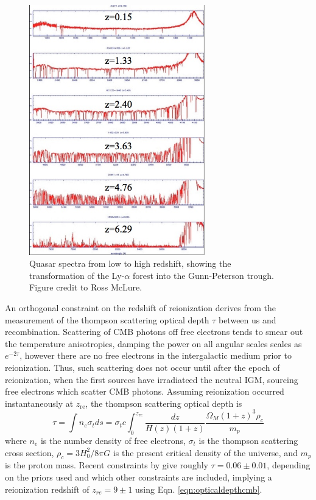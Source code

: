 \begin{figure}
	\centering
	\includegraphics[width=3in]{chap0_intro/lymanalpha_diffz.jpg}
	\caption[Quasar spectra from low to high redshift, showing the transformation of the Ly-$\alpha$ forest into the Gunn-Peterson trough.]{Quasar spectra from low to high redshift, showing the transformation of the Ly-$\alpha$ forest into the Gunn-Peterson trough. Figure credit to Ross McLure.}
	\label{fig:lya}
\end{figure}

An orthogonal constraint on the redshift of reionization derives from the measurement of the thompson scattering optical depth $\tau$ between us and recombination. Scattering of CMB photons off free electrons tends to smear out the temperature anisotropies, damping the power on all angular scales scales as $e^{-2\tau}$, however there are no free electrons in the intergalactic medium prior to reionization. Thus, such scattering does not occur until after the epoch of reionization, when the first sources have irradiateed the neutral IGM, sourcing free electrons which scatter CMB photons.  Assuming reionization occurred instantaneously at $z_\text{re}$, the thompson scattering optical depth is 
\begin{equation}
\label{eqn:opticaldepthcmb}
	\tau=\int n_e\sigma_t ds=\sigma_t c\int_0^{z_{re}}\frac{dz}{H(z)(1+z)}\frac{\Omega_M(1+z)^3\rho_c}{m_p}
\end{equation}
where $n_e$ is the number density of free electrons, $\sigma_t$ is the thompson scattering cross section, $\rho_c=3H_0^2/8\pi G$ is the present critical density of the universe, and $m_p$ is the proton mass. Recent constraints by \citep{plancktau16} give roughly $\tau=0.06\pm0.01$, depending on the priors used and which other constraints are included, implying a reionization redshift of $z_{re}=9\pm1$ using Eqn. \ref{eqn:opticaldepthcmb}.

